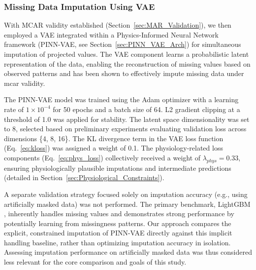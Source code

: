 \subsubsection{Missing Data Imputation Using VAE}
With MCAR validity established (Section~\ref{sec:MAR_Validation}), we then employed a VAE integrated within a Physics-Informed Neural Network framework (PINN-VAE, see Section~\ref{sec:PINN_VAE_Arch}) for simultaneous imputation of projected values. The VAE component learns a probabilistic latent representation of the data, enabling the reconstruction of missing values based on observed patterns and has been shown to effectively impute missing data under \gls{mcar} validity\cite{vanbuuren2018flexible}.

The PINN-VAE model was trained using the Adam optimizer \cite{Kingma2014Adam} with a learning rate of $1 \times 10^{-4}$ for 50 epochs and a batch size of 64. L2 gradient clipping at a threshold of 1.0 was applied for stability. The latent space dimensionality was set to 8, selected based on preliminary experiments evaluating validation loss across dimensions \{4, 8, 16\}. The KL divergence term in the VAE loss function (Eq.~\ref{eq:kloss}) was assigned a weight of 0.1. The physiology-related loss components (Eq.~\ref{eq:phys_loss}) collectively received a weight of $\lambda_{phys}=0.33$, ensuring physiologically plausible imputations and intermediate predictions (detailed in Section~\ref{sec:Physiological_Constraints}).

A separate validation strategy focused solely on imputation accuracy (e.g., using artificially masked data) was not performed. The primary benchmark, LightGBM \cite{ke2017lightgbm}, inherently handles missing values and demonstrates strong performance by potentially learning from missingness patterns. Our approach compares the explicit, constrained imputation of PINN-VAE directly against this implicit handling baseline, rather than optimizing imputation accuracy in isolation. Assessing imputation performance on artificially masked data was thus considered less relevant for the core comparison and goals of this study.

